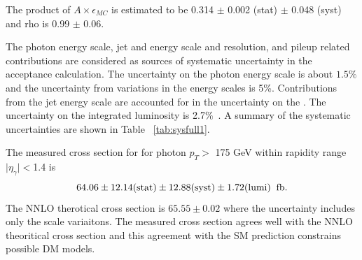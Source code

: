 The product of $A\times\epsilon_{MC}$ is estimated to be
 0.314 $\pm$ 0.002 (stat) $\pm$ 0.048 (syst) and rho is 0.99 $\pm$ 0.06.


The photon energy scale, jet and \met energy scale and resolution,
 and pileup related contributions are considered as
 sources of systematic uncertainty in the acceptance calculation.
The uncertainty on the photon energy scale is about $1.5\%$
 and the uncertainty from variations in the \met energy scales is 5\%.
Contributions from the jet energy scale are accounted for in the  uncertainty on  
the \met. 
The uncertainty on the integrated luminosity is 2.7$\%$~\cite{LUM-13-001}.
A summary of the systematic uncertainties are shown in Table ~\ref{tab:sysfull1}.

\begin{table}[htbp]
\caption[Systematic uncertainties in \pploneg]{Summary of systematic unceratinties for signal and different background sources.}
\centering
{}
\label{tab:sysfull1}%
\end{table}

The measured cross section for \ppzgnng  for photon $p_T >$ 175 GeV within
 rapidity range $\mid \eta_{\gamma}\mid < $1.4
 is 
\begin{equation}
 64.06 \pm 12.14(\mathrm{stat}) \pm 12.88(\mathrm{syst}) \pm 1.72(\mathrm{lumi})\;\; \mathrm{fb}.
\end{equation}
The NNLO therotical cross section is $65.55\pm 0.02$ \fb
  where the uncertainty includes only the scale variaitons. 
The measured cross section agrees well with the NNLO theoritical cross section
 and this agreement with the SM prediction constrains
 possible DM models.

